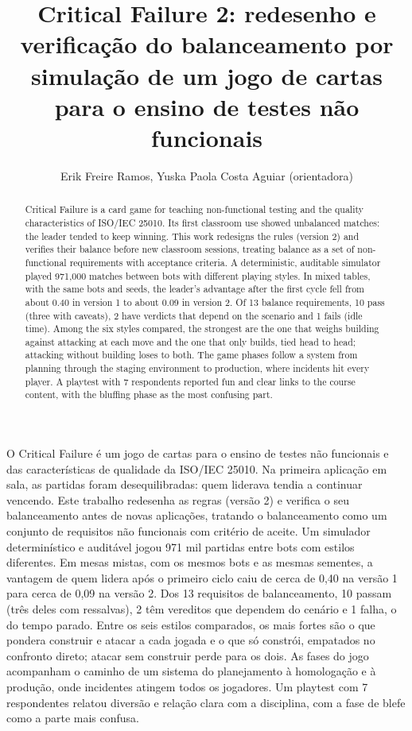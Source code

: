 \documentclass[12pt]{article}
\title{Critical Failure 2: redesenho e verificação do balanceamento por simulação de um jogo de cartas para
o ensino de testes não funcionais}
\author{Erik Freire Ramos\inst{1}, Yuska Paola Costa Aguiar\inst{1} (orientadora)}
\begin{document}


\maketitle

\begin{abstract}
  Critical Failure is a card game for teaching non-functional testing and the quality characteristics of
  ISO/IEC 25010. Its first classroom use showed unbalanced matches: the leader tended to keep winning.
  This work redesigns the rules (version 2) and verifies their balance before new classroom sessions, treating
  balance as a set of non-functional requirements with acceptance criteria. A deterministic, auditable
  simulator played 971,000 matches between bots with different playing styles. In mixed tables, with the
  same bots and seeds, the leader's advantage after the first cycle fell from about 0.40 in version 1 to about
  0.09 in version 2. Of 13 balance requirements, 10 pass (three with caveats), 2 have verdicts that
  depend on the scenario and 1 fails (idle time). Among the six styles compared, the strongest are the one that
  weighs building against attacking at each move and the one that only builds, tied head to head; attacking
  without building loses to both. The game phases follow a system from planning through the
  staging environment to production, where incidents hit every player. A playtest with 7 respondents reported fun
  and clear links to the course content, with the bluffing phase as the most confusing part.
\end{abstract}

\begin{resumo}
  O Critical Failure é um jogo de cartas para o ensino de testes não funcionais e das características de
  qualidade da ISO/IEC 25010. Na primeira aplicação em sala, as partidas foram desequilibradas: quem liderava
  tendia a continuar vencendo. Este trabalho redesenha as regras (versão 2) e verifica o seu balanceamento antes
  de novas aplicações, tratando o balanceamento como um conjunto de requisitos não funcionais com critério de
  aceite. Um simulador determinístico e auditável jogou 971 mil partidas entre bots com estilos diferentes.
  Em mesas mistas, com os mesmos bots e as mesmas sementes, a vantagem de quem lidera após o primeiro
  ciclo caiu de cerca de 0,40 na versão 1 para cerca de 0,09 na versão 2. Dos 13 requisitos de
  balanceamento, 10 passam (três deles com ressalvas), 2 têm vereditos que dependem do cenário e 1 falha, o do
  tempo parado. Entre os seis estilos comparados, os mais fortes são o que pondera construir e atacar a cada
  jogada e o que só constrói, empatados no confronto direto; atacar sem construir perde para os dois. As fases
  do jogo acompanham o caminho de um sistema do planejamento à homologação e à produção, onde incidentes atingem
  todos os jogadores. Um playtest com 7 respondentes relatou diversão e relação clara com a disciplina, com a
  fase de blefe como a parte mais confusa.
\end{resumo}
\end{document}
